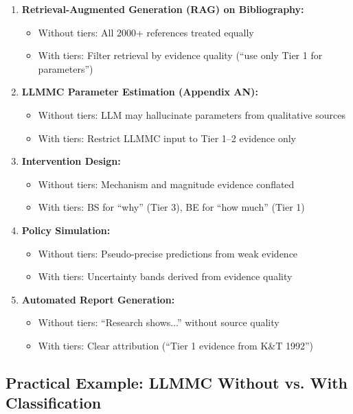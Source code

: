 \documentclass[11pt, a4paper]{article}
\begin{document}
\begin{enumerate}
\item \textbf{Retrieval-Augmented Generation (RAG) on Bibliography:}
\begin{itemize}[nosep]
    \item Without tiers: All 2000+ references treated equally
    \item With tiers: Filter retrieval by evidence quality (``use only Tier 1 for parameters'')
\end{itemize}

\item \textbf{LLMMC Parameter Estimation (Appendix AN):}
\begin{itemize}[nosep]
    \item Without tiers: LLM may hallucinate parameters from qualitative sources
    \item With tiers: Restrict LLMMC input to Tier 1--2 evidence only
\end{itemize}

\item \textbf{Intervention Design:}
\begin{itemize}[nosep]
    \item Without tiers: Mechanism and magnitude evidence conflated
    \item With tiers: BS for ``why'' (Tier 3), BE for ``how much'' (Tier 1)
\end{itemize}

\item \textbf{Policy Simulation:}
\begin{itemize}[nosep]
    \item Without tiers: Pseudo-precise predictions from weak evidence
    \item With tiers: Uncertainty bands derived from evidence quality
\end{itemize}

\item \textbf{Automated Report Generation:}
\begin{itemize}[nosep]
    \item Without tiers: ``Research shows...'' without source quality
    \item With tiers: Clear attribution (``Tier 1 evidence from K\&T 1992'')
\end{itemize}
\end{enumerate}

\subsection{Practical Example: LLMMC Without vs. With Classification}
\end{document}
